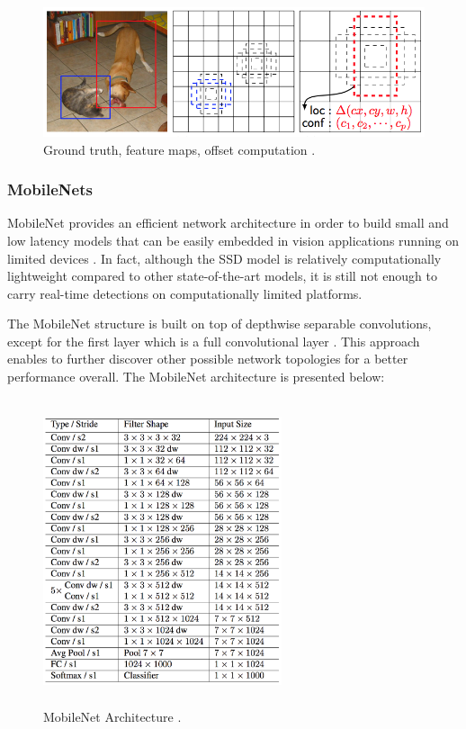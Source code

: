 \begin{figure}[!htbp]
\begin{center}
\includegraphics[width=\linewidth]{images/gt_boxes.png}
\end{center}
\caption{Ground truth, feature maps, offset computation \cite{paper:SSD}.}
\label{fig:ssdGT}
\end{figure}

\subsubsection{MobileNets}

MobileNet provides an efficient network architecture in order to build small and low latency models that can be easily embedded in vision applications running on limited devices \cite{paper:MobileNets}. In fact, although the SSD model is relatively computationally lightweight compared to other state-of-the-art models, it is still not enough to carry real-time detections on computationally limited platforms.

The MobileNet structure is built on top of depthwise separable convolutions, except for the first layer which is a full convolutional layer \cite{paper:MobileNets}. This approach enables to further discover other possible network topologies for a better performance overall. The MobileNet architecture is presented below:

\begin{figure}[H]
\begin{center}
\includegraphics[width=7cm,height=9cm,keepaspectratio]{images/mobileNet_structure.png}
\end{center}
\caption{MobileNet Architecture \cite{paper:MobileNets}.}
\end{figure}

